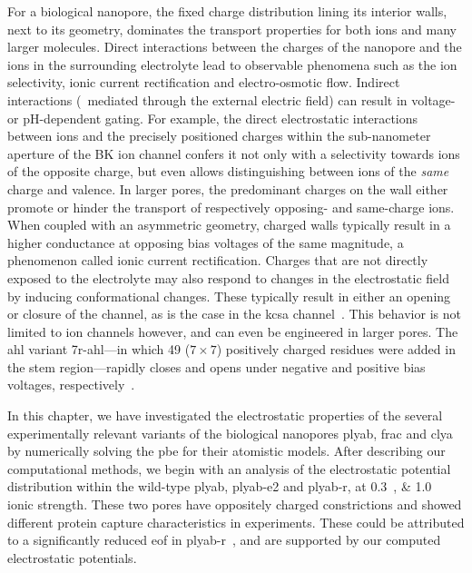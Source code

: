 For a biological nanopore, the fixed charge distribution lining its interior walls, next to its geometry,
dominates the transport properties for both ions and many larger molecules. Direct interactions between the
charges of the nanopore and the ions in the surrounding electrolyte lead to observable phenomena such as the
ion selectivity, ionic current rectification and electro-osmotic flow. Indirect interactions (\ie~mediated
through the external electric field) can result in voltage- or pH-dependent gating. For example, the direct
electrostatic interactions between ions and the precisely positioned charges within the sub-nanometer aperture
of the BK ion channel confers it not only with a selectivity towards ions of the opposite charge, but even
allows distinguishing between ions of the \emph{same} charge and valence. In larger pores, the predominant
charges on the wall either promote or hinder the transport of respectively opposing- and same-charge ions.
When coupled with an asymmetric geometry, charged walls typically result in a higher conductance at opposing
bias voltages of the same magnitude, a phenomenon called ionic current rectification. Charges that are not
directly exposed to the electrolyte may also respond to changes in the electrostatic field by inducing
conformational changes. These typically result in either an opening or closure of the channel, as is the case
in the \gls{kcsa} channel~\cite{Kopec-2019}. This behavior is not limited to ion channels however, and can
even be engineered in larger pores. The \gls{ahl} variant \gls{7r-ahl}---in which 49 ($7\times7$) positively
charged residues were added in the stem region---rapidly closes and opens under negative and positive bias
voltages, respectively~\cite{Maglia-2009}.


In this chapter, we have investigated the electrostatic properties of the several experimentally relevant
variants of the biological nanopores \gls{plyab}, \gls{frac} and \gls{clya} by numerically solving the
\gls{pbe} for their atomistic models. After describing our computational methods, we begin with an analysis of
the electrostatic potential distribution within the wild-type \gls{plyab}, \gls{plyab-e2} and \gls{plyab-r},
at \SIlist{0.3;1.0}{\Molar} ionic strength. These two pores have oppositely charged constrictions and showed
different protein capture characteristics in experiments. These could be attributed to a significantly reduced
\gls{eof} in \gls{plyab-r}~\cite{Huang-2020}, and are supported by our computed electrostatic potentials.


